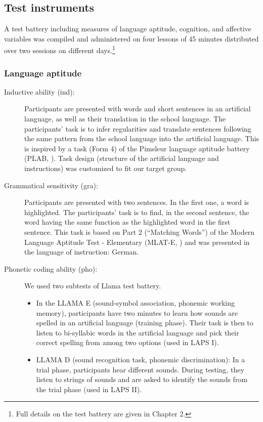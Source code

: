 \documentclass[output=paper]{langsci/langscibook}
\begin{document}
\subsection{Test instruments} 

A test battery including measures of language aptitude, cognition, and affective variables was compiled and administered on four lessons of 45 minutes distributed over two sessions on different days.\footnote{Full details on the test battery are given in Chapter 2.}

\subsubsection{Language aptitude}

\begin{description}
\item[Inductive ability (ind):] Participants are presented with words and short sentences in an artificial language, as well as their translation in the school language. The participants’ task is to infer regularities and translate sentences following the same pattern from the school language into the artificial language. This is inspired by a task (Form 4) of the Pimsleur language aptitude battery (PLAB, \citealt{Pimsleur1966}). Task design (structure of the artificial language and instructions) was customized to fit our target group.

\item[Grammatical sensitivity (gra):] Participants are presented with two sentences. In the first one, a word is highlighted. The participants’ task is to find, in the second sentence, the word having the same function as the highlighted word in the first sentence. This task is based on Part 2 (``Matching Words'') of the Modern Language Aptitude Test - Elementary (MLAT-E, \citealt{CarrollSapon1976}) and was presented in the language of instruction: German.

\item[Phonetic coding ability (pho):] We used two subtests of  Llama test battery.

\begin{itemize}
\item In the LLAMA E (sound-symbol association, phonemic working memory), participants have two minutes to learn how sounds are spelled in an artificial language (training phase). Their task is then to listen to bi-syllabic words in the artificial language and pick their correct spelling from among two options (used in LAPS I).
\item LLAMA D (sound recognition task, phonemic discrimination): In a trial phase, participants hear different sounds. During testing, they listen to strings of sounds and are asked to identify the sounds from the trial phase (used in LAPS II).
\end{itemize}
\end{description}
\end{document}

